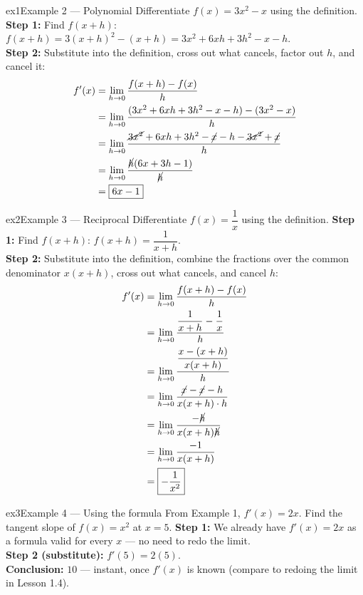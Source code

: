 \documentclass[11pt]{article}
\begin{document}
\begin{example}{ex1}{Example 2 --- Polynomial}
Differentiate $f(x)=3x^2-x$ using the definition.\soln
\textbf{Step 1:} Find $f(x+h)$: $f(x+h)=3(x+h)^2-(x+h)=3x^2+6xh+3h^2-x-h$.\\[3pt]
\textbf{Step 2:} Substitute into the definition, cross out what cancels, factor out $h$, and cancel it:
\begin{align*}
f'(x)&=\lim_{h\to0}\frac{f(x+h)-f(x)}{h}\\
&=\lim_{h\to0}\frac{(3x^2+6xh+3h^2-x-h)-(3x^2-x)}{h}\\
&=\lim_{h\to0}\frac{\cancel{3x^2}+6xh+3h^2-\cancel{x}-h-\cancel{3x^2}+\cancel{x}}{h}\\
&=\lim_{h\to0}\frac{\cancel{h}(6x+3h-1)}{\cancel{h}}\\
&=\boxed{6x-1}
\end{align*}
\end{example}

\begin{example}{ex2}{Example 3 --- Reciprocal}
Differentiate $f(x)=\dfrac1x$ using the definition.\soln
\textbf{Step 1:} Find $f(x+h)$: $f(x+h)=\dfrac{1}{x+h}$.\\[3pt]
\textbf{Step 2:} Substitute into the definition, combine the fractions over the common denominator $x(x+h)$, cross out what cancels, and cancel $h$:
\begin{align*}
f'(x)&=\lim_{h\to0}\frac{f(x+h)-f(x)}{h}\\
&=\lim_{h\to0}\dfrac{\dfrac{1}{x+h}-\dfrac{1}{x}}{h}\\
&=\lim_{h\to0}\dfrac{\dfrac{x-(x+h)}{x(x+h)}}{h}\\
&=\lim_{h\to0}\frac{\cancel{x}-\cancel{x}-h}{x(x+h)\cdot h}\\
&=\lim_{h\to0}\frac{-\cancel{h}}{x(x+h)\cancel{h}}\\
&=\lim_{h\to0}\frac{-1}{x(x+h)}\\
&=\boxed{-\frac{1}{x^2}}
\end{align*}
\end{example}

\begin{example}{ex3}{Example 4 --- Using the formula}
From Example 1, $f'(x)=2x$. Find the tangent slope of $f(x)=x^2$ at $x=5$.\soln
\textbf{Step 1:} We already have $f'(x)=2x$ as a formula valid for every $x$ --- no need to redo the limit.\\[3pt]
\textbf{Step 2 (substitute):} $f'(5)=2(5)$.\\[3pt]
\textbf{Conclusion:} $10$ --- instant, once $f'(x)$ is known (compare to redoing the limit in Lesson 1.4).
\end{example}
\end{document}
